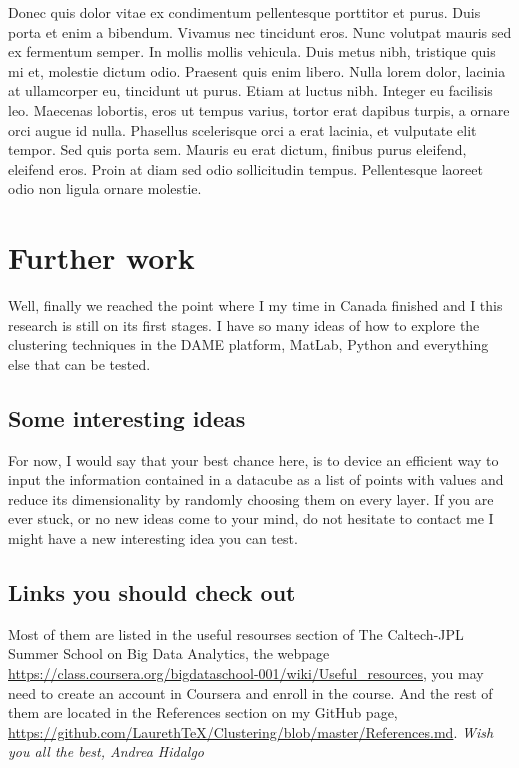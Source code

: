 \documentclass[11pt,fleqn]{book} %
\begin{document}
Donec quis dolor vitae ex condimentum pellentesque porttitor et purus. Duis porta et enim a bibendum. Vivamus nec tincidunt eros. Nunc volutpat mauris sed ex fermentum semper. In mollis mollis vehicula. Duis metus nibh, tristique quis mi et, molestie dictum odio. Praesent quis enim libero. Nulla lorem dolor, lacinia at ullamcorper eu, tincidunt ut purus. Etiam at luctus nibh. Integer eu facilisis leo. Maecenas lobortis, eros ut tempus varius, tortor erat dapibus turpis, a ornare orci augue id nulla. Phasellus scelerisque orci a erat lacinia, et vulputate elit tempor. Sed quis porta sem. Mauris eu erat dictum, finibus purus eleifend, eleifend eros. Proin at diam sed odio sollicitudin tempus. Pellentesque laoreet odio non ligula ornare molestie.
\newpage

\section{Further work}
Well, finally we reached the point where I my time in Canada finished and I this research is still on its first stages. I have so many ideas of how to explore the clustering techniques in the DAME platform, MatLab, Python and everything else that can be tested. 

\subsection{Some interesting ideas}
For now, I would say that your best chance here, is to device an efficient way to input the information contained in a datacube as a list of points with values and reduce its dimensionality by randomly choosing them on every layer. If you are ever stuck, or no new ideas come to your mind, do not hesitate to contact me I might have a new interesting idea you can test.

\subsection{Links you should check out}
Most of them are listed in the useful resourses section of The Caltech-JPL Summer School on Big Data Analytics, the webpage \url{https://class.coursera.org/bigdataschool-001/wiki/Useful_resources}, you may need to create an account in Coursera and enroll in the course. And the rest of them are located in the References section on my GitHub page, \url{https://github.com/LaurethTeX/Clustering/blob/master/References.md}.
\vfill
\textit{Wish you all the best, Andrea Hidalgo}
\end{document}
